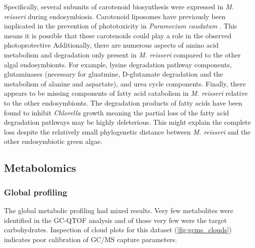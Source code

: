 Specifically, several subunits of carotenoid biosynthesis were expressed
in \textit{M. reisseri} during endosymbiosis.  Carotenoid liposomes
have previously been implicated in the prevention of phototoxicity
in \textit{Paramecium caudatum} \citep{Rich1992}.  This means
it is possible that these carotenoids could play a role in the observed photoprotective
Additionally, there are numerous aspects of amino acid metabolism and degradation
only present in \textit{M. reisseri} compared to the other algal endosymbionts.
For example, lysine degradation pathway components, 
glutaminases (necessary for gluatmine, D-glutamate degradation and the metabolism of
alanine and aspartate), and urea cycle components.
Finally, there appears to be missing components of fatty acid catabolism
in \textit{M. reisseri} relative to the other endosymbionts. The degradation
products of fatty acids have been found to inhibit \textit{Chlorella} growth \citep{Ikawa1997}
meaning the partial loss of the fatty acid degradation pathways may be 
highly deleterious.  This might explain the complete loss despite the relatively
small phylogenetic distance between \textit{M. reisseri} and the other endosymbiotic
green algae.



\subsection{Metabolomics} 

\subsubsection{Global profiling}

The global metabolic profiling had mixed results.
Very few metabolites were identified in the GC-QTOF
analysis and of those very few were the target carbohydrates.
Inspection of cloud plots for this dataset (\cref{fig:gcms_clouds})
indicates poor calibration of GC/MS capture parameters. 

